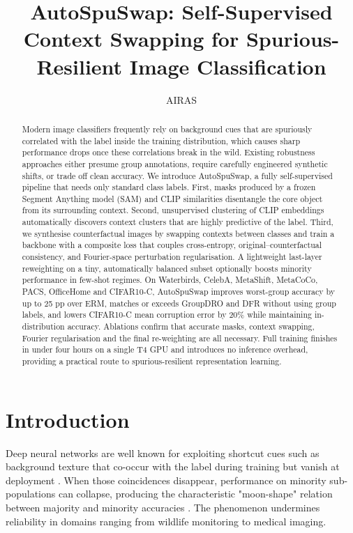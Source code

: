 \documentclass{article}
\title{AutoSpuSwap: Self-Supervised Context Swapping for Spurious-Resilient Image Classification}
\author{AIRAS}
\begin{document}
\maketitle

\begin{abstract}
Modern image classifiers frequently rely on background cues that are spuriously correlated with the label inside the training distribution, which causes sharp performance drops once these correlations break in the wild. Existing robustness approaches either presume group annotations, require carefully engineered synthetic shifts, or trade off clean accuracy. We introduce AutoSpuSwap, a fully self-supervised pipeline that needs only standard class labels. First, masks produced by a frozen Segment Anything model (SAM) and CLIP similarities disentangle the core object from its surrounding context. Second, unsupervised clustering of CLIP embeddings automatically discovers context clusters that are highly predictive of the label. Third, we synthesise counterfactual images by swapping contexts between classes and train a backbone with a composite loss that couples cross-entropy, original–counterfactual consistency, and Fourier-space perturbation regularisation. A lightweight last-layer reweighting on a tiny, automatically balanced subset optionally boosts minority performance in few-shot regimes. On Waterbirds, CelebA, MetaShift, MetaCoCo, PACS, OfficeHome and CIFAR10-C, AutoSpuSwap improves worst-group accuracy by up to 25 pp over ERM, matches or exceeds GroupDRO and DFR without using group labels, and lowers CIFAR10-C mean corruption error by 20\% while maintaining in-distribution accuracy. Ablations confirm that accurate masks, context swapping, Fourier regularisation and the final re-weighting are all necessary. Full training finishes in under four hours on a single T4 GPU and introduces no inference overhead, providing a practical route to spurious-resilient representation learning.
\end{abstract}

\section{Introduction}
Deep neural networks are well known for exploiting shortcut cues such as background texture that co-occur with the label during training but vanish at deployment \cite{geirhos-2020-shortcut}. When those coincidences disappear, performance on minority sub-populations can collapse, producing the characteristic "moon-shape" relation between majority and minority accuracies \cite{liang-2023-accuracy}. The phenomenon undermines reliability in domains ranging from wildlife monitoring to medical imaging.
\end{document}
